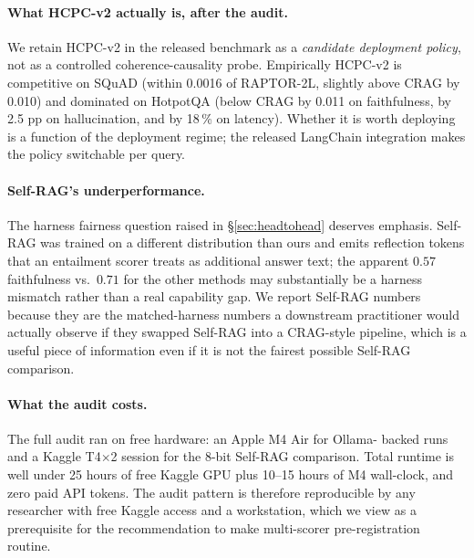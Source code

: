 \paragraph{What HCPC-v2 actually is, after the audit.}
We retain HCPC-v2 in the released benchmark as a \emph{candidate
deployment policy}, not as a controlled coherence-causality probe.
Empirically HCPC-v2 is competitive on SQuAD (within 0.0016 of
RAPTOR-2L, slightly above CRAG by 0.010) and dominated on HotpotQA
(below CRAG by 0.011 on faithfulness, by 2.5 pp on hallucination,
and by 18\,\% on latency). Whether it is worth deploying is a
function of the deployment regime; the released LangChain
integration makes the policy switchable per query.

\paragraph{Self-RAG's underperformance.}
The harness fairness question raised in \S\ref{sec:headtohead}
deserves emphasis. Self-RAG was trained on a different distribution
than ours and emits reflection tokens that an entailment scorer
treats as additional answer text; the apparent
$0.57$ faithfulness vs.\ $0.71$ for the other methods may
substantially be a harness mismatch rather than a real capability
gap. We report Self-RAG numbers because they are the
matched-harness numbers a downstream practitioner would actually
observe if they swapped Self-RAG into a CRAG-style pipeline,
which is a useful piece of information even if it is not the
fairest possible Self-RAG comparison.

\paragraph{What the audit costs.}
The full audit ran on free hardware: an Apple M4 Air for Ollama-
backed runs and a Kaggle T4\(\times\)2 session for the 8-bit Self-RAG
comparison. Total runtime is well under 25 hours of free Kaggle GPU
plus 10--15 hours of M4 wall-clock, and zero paid API tokens. The
audit pattern is therefore reproducible by any researcher with
free Kaggle access and a workstation, which we view as a
prerequisite for the recommendation to make multi-scorer
pre-registration routine.
